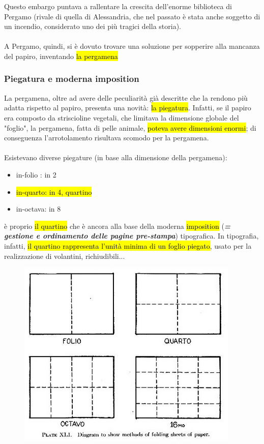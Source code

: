Questo embargo puntava a rallentare la crescita dell'enorme biblioteca di Pergamo (rivale di quella di Alessandria, che nel passato è stata anche soggetto di un incendio, considerato uno dei più tragici della storia).
\\\\
A Pergamo, quindi, si è dovuto trovare una soluzione per sopperire alla mancanza del papiro, inventando \hl{la pergamena}

\subsubsection{Piegatura e moderna imposition}
La pergamena, oltre ad avere delle peculiarità già descritte che la rendono più adatta rispetto al papiro, presenta una novità: \hl{la piegatura}. Infatti, se il papiro era composto da striscioline vegetali, che limitava la dimensione globale del "foglio", la pergamena, fatta di pelle animale, \hl{poteva avere dimensioni enormi}; di conseguenza l'arrotolamento risultava scomodo per la pergamena.
\\\\
Esistevano diverse piegature (in base alla dimensione della pergamena):
\begin{itemize}
    \item in-folio : in 2
    \item \hl{in-quarto: in 4, quartino}
    \item in-octava: in 8
\end{itemize}
è proprio \hl{il quartino} che è ancora alla base della moderna \hl{imposition} (\textbf{\textit{= gestione e ordinamento delle pagine pre-stampa}}) tipografica.
In tipografia, infatti, \hl{il quartino rappresenta l'unità minima di un foglio piegato}, usato per la realizzazione di volantini, richiudibili...
\begin{figure}[H]
    \centering
    \includegraphics[width=0.5\linewidth]{blocco_3 - storia della scrittura/imgs/Plate41_Printed Book Sheet.jpg}
\end{figure}